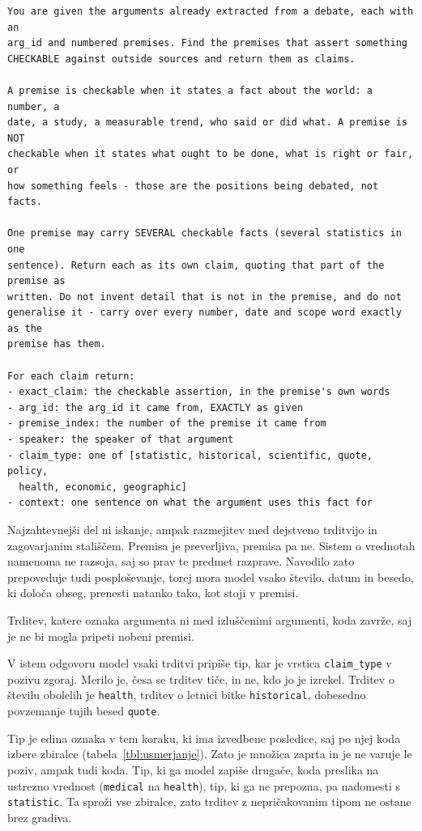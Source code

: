 \documentclass[a4paper, 12pt]{book}
\begin{document}
\begin{lstlisting}[basicstyle=\ttfamily\scriptsize,breaklines=true]
You are given the arguments already extracted from a debate, each with an
arg_id and numbered premises. Find the premises that assert something
CHECKABLE against outside sources and return them as claims.

A premise is checkable when it states a fact about the world: a number, a
date, a study, a measurable trend, who said or did what. A premise is NOT
checkable when it states what ought to be done, what is right or fair, or
how something feels - those are the positions being debated, not facts.

One premise may carry SEVERAL checkable facts (several statistics in one
sentence). Return each as its own claim, quoting that part of the premise as
written. Do not invent detail that is not in the premise, and do not
generalise it - carry over every number, date and scope word exactly as the
premise has them.

For each claim return:
- exact_claim: the checkable assertion, in the premise's own words
- arg_id: the arg_id it came from, EXACTLY as given
- premise_index: the number of the premise it came from
- speaker: the speaker of that argument
- claim_type: one of [statistic, historical, scientific, quote, policy,
  health, economic, geographic]
- context: one sentence on what the argument uses this fact for
\end{lstlisting}

Najzahtevnejši del ni iskanje, ampak razmejitev med dejstveno trditvijo in
zagovarjanim stališčem. Premisa  je preverljiva, premisa 
pa ne. Sistem o vrednotah namenoma ne razsoja, saj so prav te predmet razprave.
Navodilo zato prepoveduje tudi posploševanje, torej mora model vsako število,
datum in besedo, ki določa obseg, prenesti natanko tako, kot stoji v premisi.

Trditev, katere oznaka argumenta ni med izluščenimi argumenti, koda zavrže, saj
je ne bi mogla pripeti nobeni premisi.

V istem odgovoru model vsaki trditvi pripiše tip, kar je vrstica
\texttt{claim\_type} v pozivu zgoraj. Merilo je, česa se trditev tiče, in ne,
kdo jo je izrekel. Trditev o številu obolelih je \texttt{health}, trditev o
letnici bitke \texttt{historical}, dobesedno povzemanje tujih besed
\texttt{quote}.

Tip je edina oznaka v tem koraku, ki ima izvedbene posledice, saj po njej koda
izbere zbiralce (tabela~\ref{tbl:usmerjanje}). Zato je množica zaprta in je ne
varuje le poziv, ampak tudi koda. Tip, ki ga model zapiše drugače, koda preslika
na ustrezno vrednost (\texttt{medical} na \texttt{health}), tip, ki ga ne
prepozna, pa nadomesti s \texttt{statistic}. Ta sproži vse zbiralce, zato
trditev z nepričakovanim tipom ne ostane brez gradiva.
\end{document}

